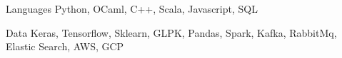 


\begin{cvskills}


\cvskill
{Languages} %
{Python, OCaml, C++, Scala, Javascript, SQL} %


\cvskill
{Data}
{Keras, Tensorflow, Sklearn, GLPK, Pandas, Spark, Kafka, RabbitMq, Elastic Search, AWS, GCP}


\end{cvskills}
